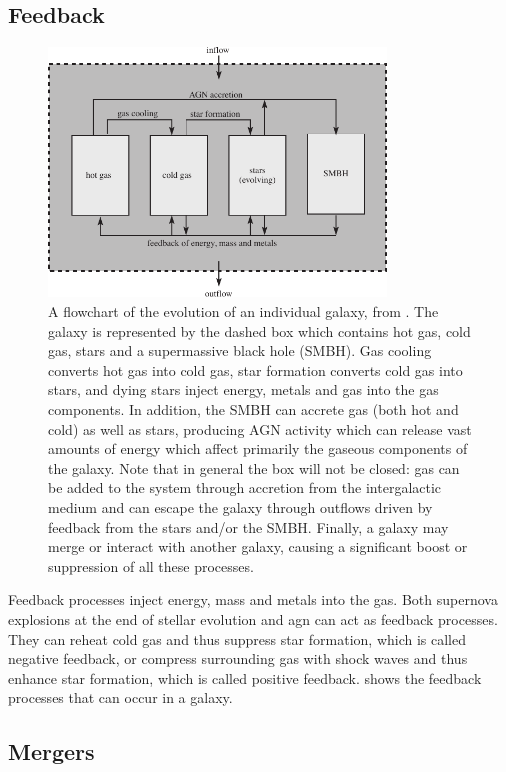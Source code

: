 \subsection{Feedback}
\begin{figure}
	\includegraphics[width=0.8\textwidth]{img/ch-05/feedback.pdf}
	\caption{A flowchart of the evolution of an individual galaxy, from \cite{galaxy-formation}. The galaxy is represented by the dashed box which contains hot gas, cold gas, stars and a supermassive black hole (SMBH). Gas cooling converts hot gas into cold gas, star formation converts cold gas into stars, and dying stars inject energy, metals and gas into the gas components. In addition, the SMBH can accrete gas (both hot and cold) as well as stars, producing AGN activity which can release vast amounts of energy which affect primarily the gaseous components of the galaxy. Note that in general the box will not be closed: gas can be added to the system through accretion from the intergalactic medium and can escape the galaxy through outflows driven by feedback from the stars and/or the SMBH. Finally, a galaxy may merge or interact with another galaxy, causing a significant boost or suppression of all these processes.}
	\label{fig:feedback}
\end{figure}
Feedback processes inject energy, mass and metals into the gas.
Both supernova explosions at the end of stellar evolution and \ac{agn} can act as feedback processes.
They can reheat cold gas and thus suppress star formation, which is called negative feedback, or compress surrounding gas with shock waves and thus enhance star formation, which is called positive feedback.
 shows the feedback processes that can occur in a galaxy.

\subsection{Mergers}

